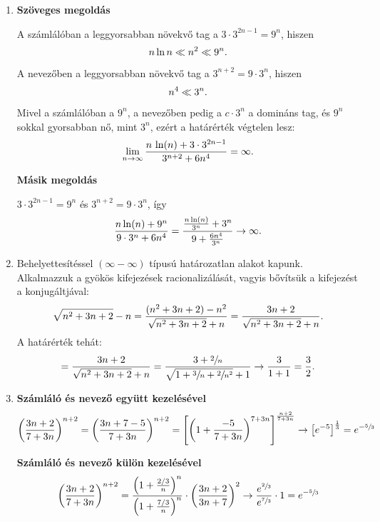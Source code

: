 \documentclass[11pt]{scrartcl}
\begin{document}
\begin{enumerate}
	\item \textbf{Szöveges megoldás}

	      A számlálóban a leggyorsabban növekvő tag a $3 \cdot 3^{2n - 1}
		      = 9^n$, hiszen
	      \[
		      n \ln n \ll n^2 \ll 9^n
		      \text.
	      \]
	      A nevezőben a leggyorsabban növekvő tag a $3^{n + 2} = 9 \cdot 3^n$,
	      hiszen
	      \[
		      n^4 \ll 3^n
		      \text.
	      \]
	      Mivel a számlálóban a $9^n$, a nevezőben pedig a $c \cdot 3^n$ a
	      domináns tag, és $9^n$ sokkal gyorsabban nő, mint $3^n$, ezért a
	      határérték végtelen lesz:
	      \[
		      \lim_{n \to \infty} \frac{
			      n \, \ln(n) + 3 \cdot 3^{2n - 1}
		      }{
			      3^{n + 2} + 6 n^4
		      } = \infty
		      \text.
	      \]

	      \textbf{Másik megoldás}

	      $3 \cdot 3^{2n - 1} = 9^n$ és $3^{n + 2} = 9 \cdot 3^n$, így
	      \[
		      \frac{n \ln(n) + 9^n}{9 \cdot 3^n + 6n^4}
		      = \frac{\frac{n \ln(n)}{3^n} + 3^n}{9 + \frac{6n^4}{3^n}}
		      \to \infty
		      \text.
	      \]

	\item Behelyettesítéssel $(\infty - \infty)$ típusú határozatlan alakot
	      kapunk. Alkalmazzuk a gyökös kifejezések racionalizálását, vagyis
	      bővítsük a kifejezést a konjugáltjával:
	      \[
		      \sqrt{n^2 + 3n + 2} - n
		      = \frac{
			      (n^2 + 3n + 2) - n^2
		      }{
			      \sqrt{n^2 + 3n + 2} + n
		      }
		      = \frac{3n + 2}{\sqrt{n^2 + 3n + 2} + n}
		      \text.
	      \]
	      A határérték tehát:
	      \[
		      = \frac{3n + 2}{\sqrt{n^2 + 3n + 2} + n}
		      = \frac{3 + \sfrac{2}{n}}{\sqrt{1 + \sfrac{3}{n} + \sfrac{2}{n^2}} + 1}
		      \to \frac{3}{1 + 1} = \frac{3}{2}
		      \text.
	      \]

	\item \textbf{Számláló és nevező együtt kezelésével}
	      \[
		      \left( \frac{3n + 2}{7 + 3n} \right)^{n + 2}
		      = \left( \frac{3n + 7 - 5}{7 + 3n} \right)^{n + 2}
		      = \left[
			      \left( 1 + \frac{-5}{7 + 3n} \right)^{7 + 3n}
			      \right]^{\frac{n + 2}{7 + 3n}}
		      \to \left[e^{-5}\right]^{\frac{1}{3}} = e^{-\sfrac{5}{3}}
	      \]

	      \textbf{Számláló és nevező külön kezelésével}
	      \[
		      \left( \frac{3n + 2}{7 + 3n} \right)^{n + 2}
		      = \frac{\left(1 + \frac{2/3}{n}\right)^n}{\left(1 + \frac{7/3}{n}\right)^n}
		      \cdot \left( \frac{3n + 2}{3n + 7} \right)^2
		      \to \frac{e^{\sfrac{2}{3}}}{e^{\sfrac{7}{3}}} \cdot 1
		      = e^{-\sfrac{5}{3}}
	      \]
\end{enumerate}
\end{document}
